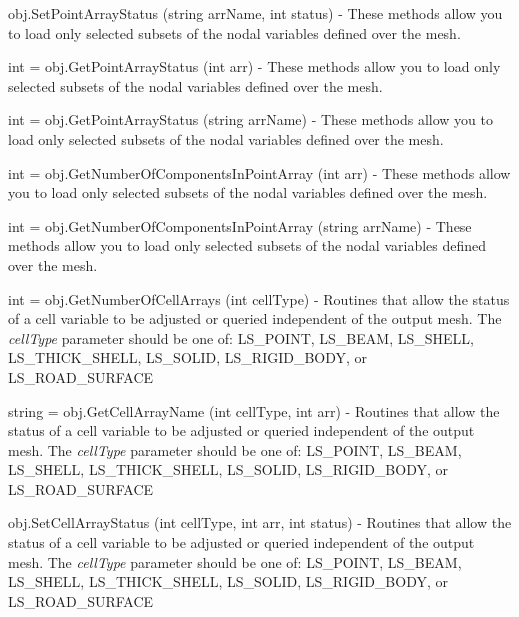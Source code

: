 \begin{DoxyItemize}
\item {\ttfamily obj.\-Set\-Point\-Array\-Status (string arr\-Name, int status)} -\/ These methods allow you to load only selected subsets of the nodal variables defined over the mesh.  
\item {\ttfamily int = obj.\-Get\-Point\-Array\-Status (int arr)} -\/ These methods allow you to load only selected subsets of the nodal variables defined over the mesh.  
\item {\ttfamily int = obj.\-Get\-Point\-Array\-Status (string arr\-Name)} -\/ These methods allow you to load only selected subsets of the nodal variables defined over the mesh.  
\item {\ttfamily int = obj.\-Get\-Number\-Of\-Components\-In\-Point\-Array (int arr)} -\/ These methods allow you to load only selected subsets of the nodal variables defined over the mesh.  
\item {\ttfamily int = obj.\-Get\-Number\-Of\-Components\-In\-Point\-Array (string arr\-Name)} -\/ These methods allow you to load only selected subsets of the nodal variables defined over the mesh.  
\item {\ttfamily int = obj.\-Get\-Number\-Of\-Cell\-Arrays (int cell\-Type)} -\/ Routines that allow the status of a cell variable to be adjusted or queried independent of the output mesh. The {\itshape cell\-Type} parameter should be one of\-: L\-S\-\_\-\-P\-O\-I\-N\-T, L\-S\-\_\-\-B\-E\-A\-M, L\-S\-\_\-\-S\-H\-E\-L\-L, L\-S\-\_\-\-T\-H\-I\-C\-K\-\_\-\-S\-H\-E\-L\-L, L\-S\-\_\-\-S\-O\-L\-I\-D, L\-S\-\_\-\-R\-I\-G\-I\-D\-\_\-\-B\-O\-D\-Y, or L\-S\-\_\-\-R\-O\-A\-D\-\_\-\-S\-U\-R\-F\-A\-C\-E  
\item {\ttfamily string = obj.\-Get\-Cell\-Array\-Name (int cell\-Type, int arr)} -\/ Routines that allow the status of a cell variable to be adjusted or queried independent of the output mesh. The {\itshape cell\-Type} parameter should be one of\-: L\-S\-\_\-\-P\-O\-I\-N\-T, L\-S\-\_\-\-B\-E\-A\-M, L\-S\-\_\-\-S\-H\-E\-L\-L, L\-S\-\_\-\-T\-H\-I\-C\-K\-\_\-\-S\-H\-E\-L\-L, L\-S\-\_\-\-S\-O\-L\-I\-D, L\-S\-\_\-\-R\-I\-G\-I\-D\-\_\-\-B\-O\-D\-Y, or L\-S\-\_\-\-R\-O\-A\-D\-\_\-\-S\-U\-R\-F\-A\-C\-E  
\item {\ttfamily obj.\-Set\-Cell\-Array\-Status (int cell\-Type, int arr, int status)} -\/ Routines that allow the status of a cell variable to be adjusted or queried independent of the output mesh. The {\itshape cell\-Type} parameter should be one of\-: L\-S\-\_\-\-P\-O\-I\-N\-T, L\-S\-\_\-\-B\-E\-A\-M, L\-S\-\_\-\-S\-H\-E\-L\-L, L\-S\-\_\-\-T\-H\-I\-C\-K\-\_\-\-S\-H\-E\-L\-L, L\-S\-\_\-\-S\-O\-L\-I\-D, L\-S\-\_\-\-R\-I\-G\-I\-D\-\_\-\-B\-O\-D\-Y, or L\-S\-\_\-\-R\-O\-A\-D\-\_\-\-S\-U\-R\-F\-A\-C\-E  

\end{DoxyItemize}
